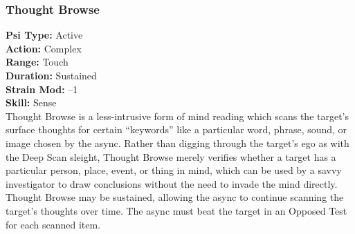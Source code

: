 \subsubsection{Thought Browse}
\textbf{Psi Type:} Active \\ 
\textbf{Action:} Complex \\ 
\textbf{Range:} Touch \\ 
\textbf{Duration:} Sustained \\
\textbf{Strain Mod:} –1 \\ 
\textbf{Skill:} Sense\\
Thought Browse is a less-intrusive form of mind
reading which scans the target’s surface thoughts for
certain “keywords” like a particular word, phrase,
sound, or image chosen by the async. Rather than digging
through the target’s ego as with the Deep Scan
sleight, Thought Browse merely verifies whether a
target has a particular person, place, event, or thing
in mind, which can be used by a savvy investigator to
draw conclusions without the need to invade the mind
directly. Thought Browse may be sustained, allowing
the async to continue scanning the target’s thoughts
over time. The async must beat the target in an Opposed
Test for each scanned item.

